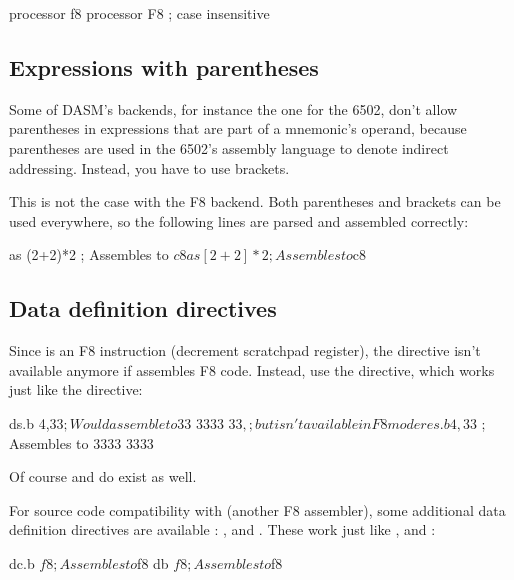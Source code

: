 \begin{usage}
	processor f8
	processor F8	; case insensitive
\end{usage}

\subsection{Expressions with parentheses}


Some of DASM's backends, for instance the one for the 6502,
don't allow parentheses in expressions that are part of a
mnemonic's operand, because parentheses are used in the 
6502's assembly language to denote indirect addressing.
Instead, you have to use brackets.

This is not the case with the F8 backend. Both parentheses
and brackets can be used everywhere, so the following lines
are parsed and assembled correctly:

\begin{code}
        as      (2+2)*2 ; Assembles to $c8
        as      [2+2]*2 ; Assembles to $c8
\end{code}

\subsection{Data definition directives}


Since  is an F8 instruction (decrement scratchpad register),
the  directive isn't available anymore if \dasm assembles
F8 code. Instead, use the  directive, which works just like
the  directive:

\begin{code}
        ds.b    4,$33   ; Would assemble to $33 $33 $33 $33,
                        ; but isn't available in F8 mode
        res.b   4,$33   ; Assembles to $33 $33 $33 $33
\end{code}
        
Of course  and  do exist as well.


For source code compatibility with  (another F8 assembler), some
additional data definition directives are available : ,  and .
These work just like ,  and :

\begin{code}
        dc.b    $f8     ; Assembles to $f8
        db      $f8     ; Assembles to $f8
\end{code}

